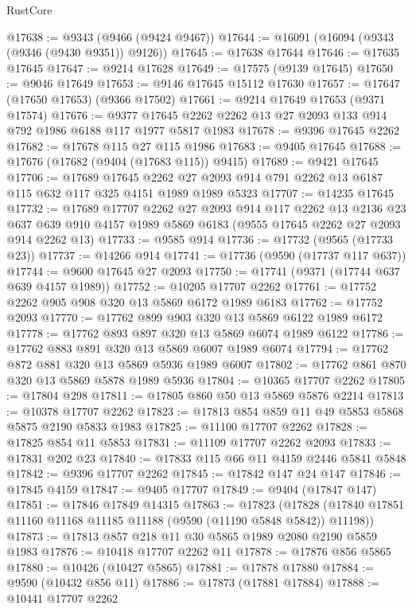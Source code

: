 \begin{lexlean}{RustCore}
\begin{coremodule}
@17638 := @9343 (@9466 (@9424 @9467))
@17644 := @16091 (@16094 (@9343 (@9346 (@9430 @9351)) @9126))
@17645 := @17638 @17644
@17646 := @17635 @17645
@17647 := @9214 @17628
@17649 := @17575 (@9139 @17645)
@17650 := @9046 @17649
@17653 := @9146 @17645 @15112 @17630
@17657 := @17647 (@17650 @17653) (@9366 @17502)
@17661 := @9214 @17649 @17653 (@9371 @17574)
@17676 := @9377 @17645 @2262 @2262 @13 @27 @2093 @133 @914 @792 @1986 @6188 @117 @1977 @5817 @1983
@17678 := @9396 @17645 @2262
@17682 := @17678 @115 @27 @115 @1986
@17683 := @9405 @17645
@17688 := @17676 (@17682 (@9404 (@17683 @115)) @9415)
@17689 := @9421 @17645
@17706 := @17689
    @17645
    @2262
    @27
    @2093
    @914
    @791
    @2262
    @13
    @6187
    @115
    @632
    @117
    @325
    @4151
    @1989
    @1989
    @5323
@17707 := @14235 @17645
@17732 := @17689
    @17707
    @2262
    @27
    @2093
    @914
    @117
    @2262
    @13
    @2136
    @23
    @637
    @639
    @910
    @4157
    @1989
    @5869
    @6183
    (@9555 @17645 @2262 @27 @2093 @914 @2262 @13)
@17733 := @9585 @914
@17736 := @17732 (@9565 (@17733 @23))
@17737 := @14266 @914
@17741 := @17736 (@9590 (@17737 @117 @637))
@17744 := @9600 @17645 @27 @2093
@17750 := @17741 (@9371 (@17744 @637 @639 @4157 @1989))
@17752 := @10205 @17707 @2262
@17761 := @17752 @2262 @905 @908 @320 @13 @5869 @6172 @1989 @6183
@17762 := @17752 @2093
@17770 := @17762 @899 @903 @320 @13 @5869 @6122 @1989 @6172
@17778 := @17762 @893 @897 @320 @13 @5869 @6074 @1989 @6122
@17786 := @17762 @883 @891 @320 @13 @5869 @6007 @1989 @6074
@17794 := @17762 @872 @881 @320 @13 @5869 @5936 @1989 @6007
@17802 := @17762 @861 @870 @320 @13 @5869 @5878 @1989 @5936
@17804 := @10365 @17707 @2262
@17805 := @17804 @298
@17811 := @17805 @860 @50 @13 @5869 @5876 @2214
@17813 := @10378 @17707 @2262
@17823 := @17813 @854 @859 @11 @49 @5853 @5868 @5875 @2190 @5833 @1983
@17825 := @11100 @17707 @2262
@17828 := @17825 @854 @11 @5853
@17831 := @11109 @17707 @2262 @2093
@17833 := @17831 @202 @23
@17840 := @17833 @115 @66 @11 @4159 @2446 @5841 @5848
@17842 := @9396 @17707 @2262
@17845 := @17842 @147 @24 @147
@17846 := @17845 @4159
@17847 := @9405 @17707
@17849 := @9404 (@17847 @147)
@17851 := @17846 @17849 @14315
@17863 := @17823
    (@17828 (@17840 @17851 @11160 @11168 @11185 @11188 (@9590 (@11190 @5848 @5842)) @11198))
@17873 := @17813 @857 @218 @11 @30 @5865 @1989 @2080 @2190 @5859 @1983
@17876 := @10418 @17707 @2262 @11
@17878 := @17876 @856 @5865
@17880 := @10426 (@10427 @5865)
@17881 := @17878 @17880
@17884 := @9590 (@10432 @856 @11)
@17886 := @17873 (@17881 @17884)
@17888 := @10441 @17707 @2262

\end{coremodule}
\end{lexlean}
